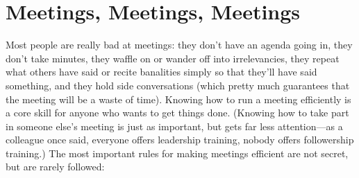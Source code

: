 \chapter{Meetings, Meetings, Meetings}\label{s:meetings}

Most people are really bad at meetings: they don't have an agenda going
in, they don't take minutes, they waffle on or wander off into
irrelevancies, they repeat what others have said or recite banalities
simply so that they'll have said something, and they hold side
conversations (which pretty much guarantees that the meeting will be a
waste of time). Knowing how to run a meeting efficiently is a core skill
for anyone who wants to get things done. (Knowing how to take part in
someone else's meeting is just as important, but gets far less
attention---as a colleague once said, everyone offers leadership
training, nobody offers followership training.) The most important rules
for making meetings efficient are not secret, but are rarely followed:

